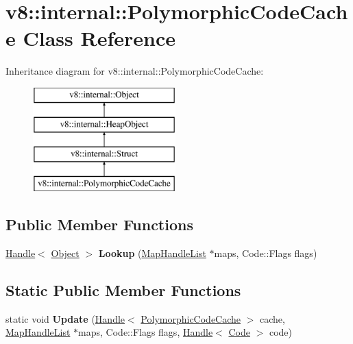 \hypertarget{classv8_1_1internal_1_1_polymorphic_code_cache}{}\section{v8\+:\+:internal\+:\+:Polymorphic\+Code\+Cache Class Reference}
\label{classv8_1_1internal_1_1_polymorphic_code_cache}
Inheritance diagram for v8\+:\+:internal\+:\+:Polymorphic\+Code\+Cache\+:\begin{figure}[H]
\begin{center}
\leavevmode
\includegraphics[height=4.000000cm]{classv8_1_1internal_1_1_polymorphic_code_cache}
\end{center}
\end{figure}
\subsection*{Public Member Functions}
\begin{DoxyCompactItemize}
\item 
\hypertarget{classv8_1_1internal_1_1_polymorphic_code_cache_a29d8cee641d7fb31cdf4037d89ed7075}{}\hyperlink{classv8_1_1internal_1_1_handle}{Handle}$<$ \hyperlink{classv8_1_1internal_1_1_object}{Object} $>$ {\bfseries Lookup} (\hyperlink{classv8_1_1internal_1_1_list}{Map\+Handle\+List} $\ast$maps, Code\+::\+Flags flags)\label{classv8_1_1internal_1_1_polymorphic_code_cache_a29d8cee641d7fb31cdf4037d89ed7075}

\end{DoxyCompactItemize}
\subsection*{Static Public Member Functions}
\begin{DoxyCompactItemize}
\item 
\hypertarget{classv8_1_1internal_1_1_polymorphic_code_cache_ad48350fdb9f03e5021d06705bc117f9b}{}static void {\bfseries Update} (\hyperlink{classv8_1_1internal_1_1_handle}{Handle}$<$ \hyperlink{classv8_1_1internal_1_1_polymorphic_code_cache}{Polymorphic\+Code\+Cache} $>$ cache, \hyperlink{classv8_1_1internal_1_1_list}{Map\+Handle\+List} $\ast$maps, Code\+::\+Flags flags, \hyperlink{classv8_1_1internal_1_1_handle}{Handle}$<$ \hyperlink{classv8_1_1internal_1_1_code}{Code} $>$ code)\label{classv8_1_1internal_1_1_polymorphic_code_cache_ad48350fdb9f03e5021d06705bc117f9b}

\end{DoxyCompactItemize}
